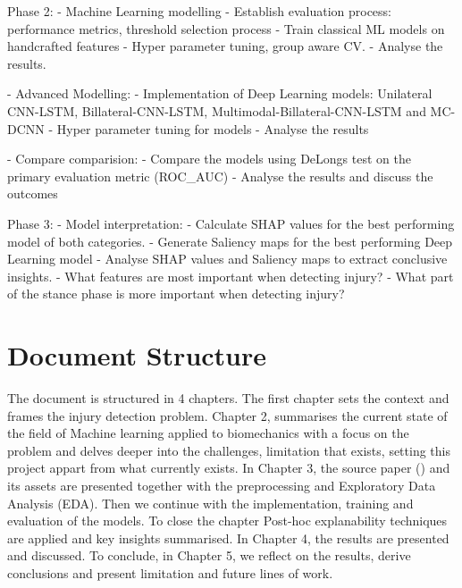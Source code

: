 Phase 2:
- Machine Learning modelling
    - Establish evaluation process: performance metrics, threshold selection process
    - Train classical ML models on handcrafted features
    - Hyper parameter tuning, group aware CV.
    - Analyse the results.

- Advanced Modelling:
    - Implementation of Deep Learning models: Unilateral CNN-LSTM, Billateral-CNN-LSTM, Multimodal-Billateral-CNN-LSTM and MC-DCNN
    - Hyper parameter tuning for models
    - Analyse the results

- Compare comparision:
    - Compare the models using DeLongs test on the primary evaluation metric (ROC\_AUC)
    - Analyse the results and discuss the outcomes

Phase 3:
- Model interpretation:
    - Calculate SHAP values for the best performing model of both categories.
    - Generate Saliency maps for the best performing Deep Learning model
    - Analyse SHAP values and Saliency maps to extract conclusive insights.
        - What features are most important when detecting injury?
        - What part of the stance phase is more important when detecting injury?

\section{Document Structure}\label{sec:intro-structure}
The document is structured in 4 chapters. The first chapter sets the context and frames the injury detection problem. Chapter 2, summarises the current state of the field of Machine learning applied to biomechanics with a focus on the problem and delves deeper into the challenges, limitation that exists, setting this project appart from what currently exists. In Chapter 3, the source paper (\cite{Ferber2024}) and its assets are presented together with the preprocessing and Exploratory Data Analysis (EDA). Then we continue with the implementation, training and evaluation of the models. To close the chapter Post-hoc explanability techniques are applied and key insights summarised. In Chapter 4, the results are presented and discussed. To conclude, in Chapter 5, we reflect on the results, derive conclusions and present limitation and future lines of work.
